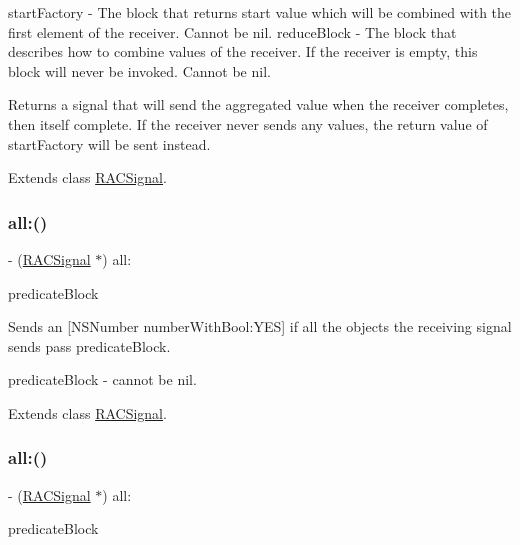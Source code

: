 start\+Factory -\/ The block that returns start value which will be combined with the first element of the receiver. Cannot be nil. reduce\+Block -\/ The block that describes how to combine values of the receiver. If the receiver is empty, this block will never be invoked. Cannot be nil.

Returns a signal that will send the aggregated value when the receiver completes, then itself complete. If the receiver never sends any values, the return value of {\ttfamily start\+Factory} will be sent instead. 

Extends class \mbox{\hyperlink{interface_r_a_c_signal_a51c08c7a357f83c96c468a6aa13d4d87}{R\+A\+C\+Signal}}.

\mbox{\label{category_r_a_c_signal_07_operations_08_adb70e0b813cec0b7bcc5c76f2f3cd88f}} 
\subsubsection{\texorpdfstring{all\+:()}{all:()}\hspace{0.1cm}{\footnotesize\ttfamily [1/3]}}
{\footnotesize\ttfamily -\/ (\mbox{\hyperlink{interface_r_a_c_signal}{R\+A\+C\+Signal}} $\ast$) all\+: \begin{DoxyParamCaption}\item[{(B\+O\+OL($^\wedge$)(id object))}]{predicate\+Block }\end{DoxyParamCaption}}

Sends an \mbox{[}N\+S\+Number number\+With\+Bool\+:Y\+ES\mbox{]} if all the objects the receiving signal sends pass {\ttfamily predicate\+Block}.

predicate\+Block -\/ cannot be nil. 

Extends class \mbox{\hyperlink{interface_r_a_c_signal_adb70e0b813cec0b7bcc5c76f2f3cd88f}{R\+A\+C\+Signal}}.

\mbox{\label{category_r_a_c_signal_07_operations_08_adb70e0b813cec0b7bcc5c76f2f3cd88f}} 
\subsubsection{\texorpdfstring{all\+:()}{all:()}\hspace{0.1cm}{\footnotesize\ttfamily [2/3]}}
{\footnotesize\ttfamily -\/ (\mbox{\hyperlink{interface_r_a_c_signal}{R\+A\+C\+Signal}} $\ast$) all\+: \begin{DoxyParamCaption}\item[{(B\+O\+OL($^\wedge$)(id object))}]{predicate\+Block }\end{DoxyParamCaption}}


